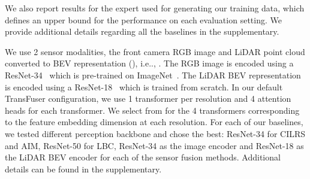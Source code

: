 \documentclass[final]{cvpr}
\makeatletter
\DeclareRobustCommand\onedot{\futurelet\@let@token\@onedot}
\def\@onedot{\ifx\@let@token.\else.\null\fi\xspace}
\def\ie{i.e\onedot} \def\Ie{I.e\onedot}
\newcommand{\boldparagraph}[1]{\vspace{0.1cm}\noindent{\bf #1:}}
\makeatother
\begin{document}
We also report results for the expert used for generating our training data, which defines an upper bound for the performance on each evaluation setting. We provide additional details regarding all the baselines in the supplementary. 

\boldparagraph{Implementation Details} We use 2 sensor modalities, the front camera RGB image and LiDAR point cloud converted to BEV representation (), \ie, . The RGB image is encoded using a ResNet-34~\cite{He2016CVPR} which is pre-trained on ImageNet~\cite{Deng2009CVPR}. The LiDAR BEV representation is encoded using a ResNet-18~\cite{He2016CVPR} which is trained from scratch. In our default TransFuser configuration, we use 1 transformer per resolution and 4 attention heads for each transformer. We select  from  for the 4 transformers corresponding to the feature embedding dimension  at each resolution. For each of our baselines, we tested different perception backbone and chose the best: ResNet-34 for CILRS and AIM, ResNet-50 for LBC, ResNet-34 as the image encoder and ResNet-18 as the LiDAR BEV encoder for each of the sensor fusion methods. Additional details can be found in the supplementary.
\end{document}
